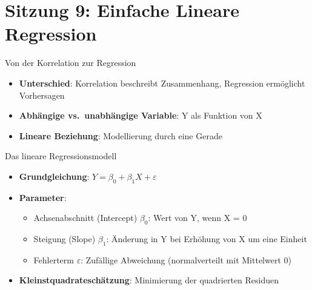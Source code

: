 \documentclass[
  ignorenonframetext,
]{beamer}
\providecommand{\tightlist}{%
  \setlength{\itemsep}{0pt}\setlength{\parskip}{0pt}}
\begin{document}
\section{Sitzung 9: Einfache Lineare
Regression}\label{sitzung-9-einfache-lineare-regression}

\begin{frame}{Von der Korrelation zur Regression}
\protect{}\label{von-der-korrelation-zur-regression}
\begin{itemize}
\tightlist
\item
  \textbf{Unterschied}: Korrelation beschreibt Zusammenhang, Regression
  ermöglicht Vorhersagen
\item
  \textbf{Abhängige vs.~unabhängige Variable}: Y als Funktion von X
\item
  \textbf{Lineare Beziehung}: Modellierung durch eine Gerade
\end{itemize}
\end{frame}

\begin{frame}{Das lineare Regressionsmodell}
\protect{}\label{das-lineare-regressionsmodell}
\begin{itemize}
\tightlist
\item
  \textbf{Grundgleichung}: \(Y = \beta_0 + \beta_1 X + \varepsilon\)
\item
  \textbf{Parameter}:

  \begin{itemize}
  \tightlist
  \item
    Achsenabschnitt (Intercept) \(\beta_0\): Wert von Y, wenn X = 0
  \item
    Steigung (Slope) \(\beta_1\): Änderung in Y bei Erhöhung von X um
    eine Einheit
  \item
    Fehlerterm \(\varepsilon\): Zufällige Abweichung (normalverteilt mit
    Mittelwert 0)
  \end{itemize}
\item
  \textbf{Kleinstquadrateschätzung}: Minimierung der quadrierten
  Residuen
\end{itemize}
\end{frame}
\end{document}
